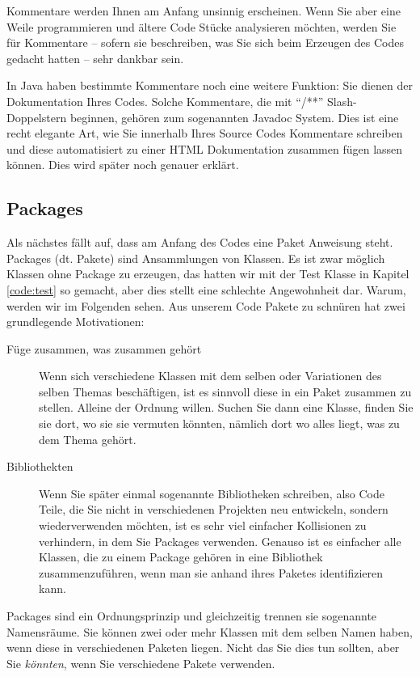 Kommentare werden Ihnen am Anfang unsinnig erscheinen. Wenn Sie aber eine Weile programmieren und ältere Code Stücke analysieren möchten, werden Sie für Kommentare -- sofern sie beschreiben, was Sie sich beim Erzeugen des Codes gedacht hatten -- sehr dankbar sein.

In Java haben bestimmte Kommentare noch eine weitere Funktion: Sie dienen der Dokumentation Ihres Codes. Solche Kommentare, die mit "`/**"' Slash-Doppelstern beginnen, gehören zum sogenannten Javadoc System. Dies ist eine recht elegante Art, wie Sie innerhalb Ihres Source Codes Kommentare schreiben und diese automatisiert zu einer HTML Dokumentation zusammen fügen lassen können. Dies wird später noch genauer erklärt.  

\subsection{Packages}
Als nächstes fällt auf, dass am Anfang des Codes eine Paket Anweisung steht. Packages (dt. Pakete) sind Ansammlungen von Klassen. Es ist zwar möglich Klassen ohne Package zu erzeugen, das hatten wir mit der Test Klasse in Kapitel \ref{code:test} so gemacht, aber dies stellt eine schlechte Angewohnheit dar. Warum, werden wir im Folgenden sehen. Aus unserem Code Pakete zu schnüren hat zwei grundlegende Motivationen: 

\begin{description}
\item[Füge zusammen, was zusammen gehört]
Wenn sich verschiedene Klassen mit dem selben oder Variationen des selben Themas beschäftigen, ist es sinnvoll diese in ein Paket zusammen zu stellen. Alleine der Ordnung willen. Suchen Sie dann eine Klasse, finden Sie sie dort, wo sie sie vermuten könnten, nämlich dort wo alles liegt, was zu dem Thema gehört. 
\item[Bibliothekten]
Wenn Sie später einmal sogenannte Bibliotheken schreiben, also Code Teile, die Sie nicht in verschiedenen Projekten neu entwickeln, sondern wiederverwenden möchten, ist es sehr viel einfacher Kollisionen zu verhindern, in dem Sie Packages verwenden. Genauso ist es einfacher alle Klassen, die zu einem Package gehören in eine Bibliothek zusammenzuführen, wenn man sie anhand ihres Paketes identifizieren kann. 
\end{description}

Packages sind ein Ordnungsprinzip und gleichzeitig trennen sie sogenannte Namensräume. Sie können zwei oder mehr Klassen mit dem selben Namen haben, wenn diese in verschiedenen Paketen liegen. Nicht das Sie dies tun sollten, aber Sie \textit{könnten}, wenn Sie verschiedene Pakete verwenden.

